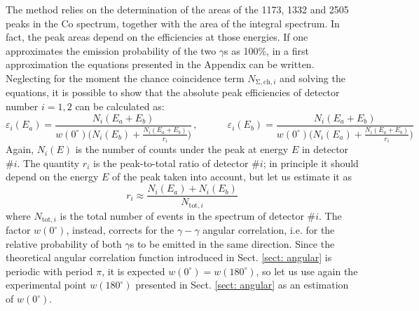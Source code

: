 \documentclass[a4paper]{article}
\begin{document}
The method relies on the determination of the areas of the 1173, 1332 and 2505 peaks in the Co spectrum, together with the area of the integral spectrum. In fact, the peak areas depend on the efficiencies at those energies. 
If one approximates the emission probability of the two $\gamma$s as 100\%, in a first approximation the equations presented in the Appendix can be written. Neglecting for the moment the chance coincidence term $N_{\mathrm{\Sigma,ch},i}$ and solving the equations, it is possible to show that the absolute peak efficiencies of detector number $i=1,2$ can be calculated as:
\begin{equation}\label{eq: efficiency sum peak}
    \varepsilon_{i}(E_a)=\frac{N_i(E_a\!+\!E_b)}{w(0^\circ)\big(N_i(E_b)+\frac{N_i(E_a\!+\!E_b)}{r_i}\big)}\,,\quad\quad\quad
    \varepsilon_{i}(E_b)=\frac{N_i(E_a\!+\!E_b)}{w(0^\circ)\big(N_i(E_a)+\frac{N_i(E_a\!+\!E_b)}{r_i}\big)}
\end{equation}
Again, $N_i(E)$ is the number of counts under the peak at energy $E$ in detector $\#i$. The quantity $r_i$ is the peak-to-total ratio of detector $\#i$; in principle it should depend on the energy $E$ of the peak taken into account, but let us estimate it as
\begin{equation} \label{eq:peak to total ratio}
    r_i\approx\frac{N_i(E_a)+N_i(E_b)}{N_{\mathrm{tot},i}}
\end{equation}
where $N_{\mathrm{tot},i}$ is the total number of events in the spectrum of detector $\#i$.
The factor $w(0^\circ)$, instead, corrects for the $\gamma-\gamma$ angular correlation, i.e. for the relative probability of both $\gamma$s to be emitted in the same direction. Since the theoretical angular correlation function introduced in Sect. \ref{sect: angular} is periodic with period $\pi$, it is expected $w(0^\circ)\!=\!w(180^\circ)$, so let us use again the experimental point $w(180^\circ)$ presented in Sect. \ref{sect: angular} as an estimation of $w(0^\circ)$.
\end{document}
